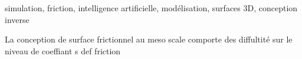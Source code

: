 \begin{sommaire}{simulation, friction, intelligence artificielle, modélisation, surfaces 3D, conception inverse}

    La conception de surface frictionnel au meso scale comporte des diffultité sur le niveau de coeffiant s def friction 
    
    \end{sommaire}